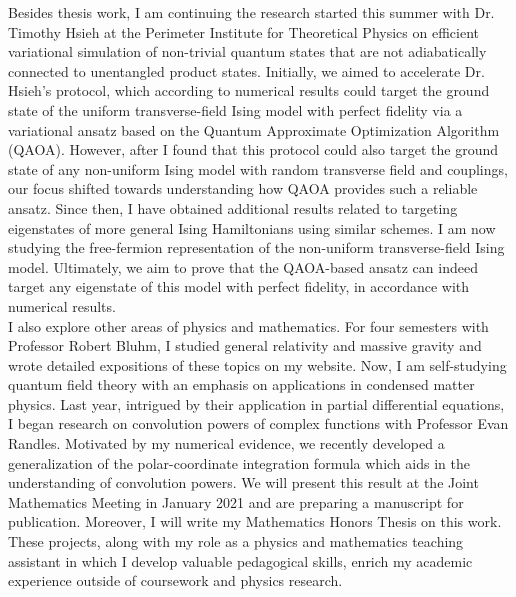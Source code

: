 Besides thesis work, I am continuing the research started this summer with Dr. Timothy Hsieh at the Perimeter Institute for Theoretical Physics on efficient variational simulation of non-trivial quantum states that are not adiabatically connected to unentangled product states. Initially, we aimed to accelerate Dr. Hsieh's protocol, which according to numerical results could target the ground state of the uniform transverse-field Ising model with perfect fidelity via a variational ansatz based on the Quantum Approximate Optimization Algorithm (QAOA). However, after I found that this protocol could also target the ground state of any non-uniform Ising model with random transverse field and couplings, our focus shifted towards understanding how QAOA provides such a reliable ansatz. Since then, I have obtained additional results related to targeting eigenstates of more general Ising Hamiltonians using similar schemes. I am now studying the free-fermion representation of the non-uniform transverse-field Ising model. Ultimately, we aim to prove that the QAOA-based ansatz can indeed target any eigenstate of this model with perfect fidelity, in accordance with numerical results.  \\

I also explore other areas of physics and mathematics. For four semesters with Professor Robert Bluhm, I studied general relativity and massive gravity and wrote detailed expositions of these topics on my website. Now, I am self-studying quantum field theory with an emphasis on applications in condensed matter physics. Last year, intrigued by their application in partial differential equations, I began research on convolution powers of complex functions with Professor Evan Randles. Motivated by my numerical evidence, we recently developed a generalization of the polar-coordinate integration formula which aids in the understanding of convolution powers. We will present this result at the Joint Mathematics Meeting in January 2021 and are preparing a manuscript for publication. Moreover, I will write my Mathematics Honors Thesis on this work. These projects, along with my role as a physics and mathematics teaching assistant in which I develop valuable pedagogical skills, enrich my academic experience outside of coursework and physics research.  \\ 



